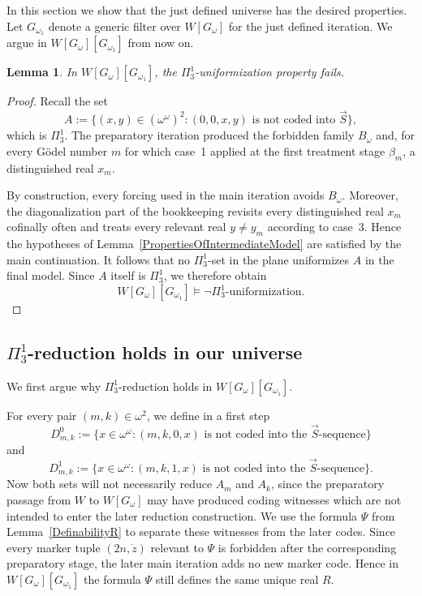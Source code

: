 \documentclass[a4paper,11pt]{article}
\newtheorem{lemma}[theorem]{Lemma}
\begin{document}
In this section we show that the just defined universe has the desired properties.
Let $G_{\omega_1}$ denote a generic filter over $W[G_\omega]$ for the just defined iteration. We argue in $W[G_\omega][G_{\omega_1}]$ from now on.

\begin{lemma}\label{FailureUniformizationFinalModel}
In $W[G_\omega][G_{\omega_1}]$, the $\Pi^1_3$-uniformization property fails.
\end{lemma}

\begin{proof}
Recall the set
\[
A:=\{(x,y)\in(\omega^\omega)^2:(0,0,x,y)\text{ is not coded into }\vec S\},
\]
which is $\Pi^1_3$. The preparatory iteration produced the forbidden family $B_\omega$ and, for every G\"odel number $m$ for which case~1 applied at the first treatment stage $\beta_m$, a distinguished real $x_m$.

By construction, every forcing used in the main iteration avoids $B_\omega$. Moreover, the diagonalization part of the bookkeeping revisits every distinguished real $x_m$ cofinally often and treats every relevant real $y\neq y_m$ according to case~3. Hence the hypotheses of Lemma~\ref{PropertiesOfIntermediateModel} are satisfied by the main continuation. It follows that no $\Pi^1_3$-set in the plane uniformizes $A$ in the final model. Since $A$ itself is $\Pi^1_3$, we therefore obtain
\[
W[G_\omega][G_{\omega_1}]\models\neg\Pi^1_3\text{-uniformization}.
\]
\end{proof}

\subsection{\texorpdfstring{$\Pi^1_3$}{Pi13}-reduction holds in our universe}
We first argue why $\Pi^1_3$-reduction holds in $W[G_\omega][G_{\omega_1}]$.

For every pair $(m,k)\in\omega^2$, we define in a first step
\[
D^0_{m,k}:=\{x\in\omega^\omega:(m,k,0,x)\text{ is not coded into the }\vec S\text{-sequence}\}
\]
and
\[
D^1_{m,k}:=\{x\in\omega^\omega:(m,k,1,x)\text{ is not coded into the }\vec S\text{-sequence}\}.
\]
Now both sets will not necessarily reduce $A_m$ and $A_k$, since the preparatory passage from $W$ to $W[G_\omega]$ may have produced coding witnesses which are not intended to enter the later reduction construction. We use the formula $\Psi$ from Lemma~\ref{DefinabilityR} to separate these witnesses from the later codes. Since every marker tuple $(2n,\dot z)$ relevant to $\Psi$ is forbidden after the corresponding preparatory stage, the later main iteration adds no new marker code. Hence in $W[G_\omega][G_{\omega_1}]$ the formula $\Psi$ still defines the same unique real $R$.
\end{document}

